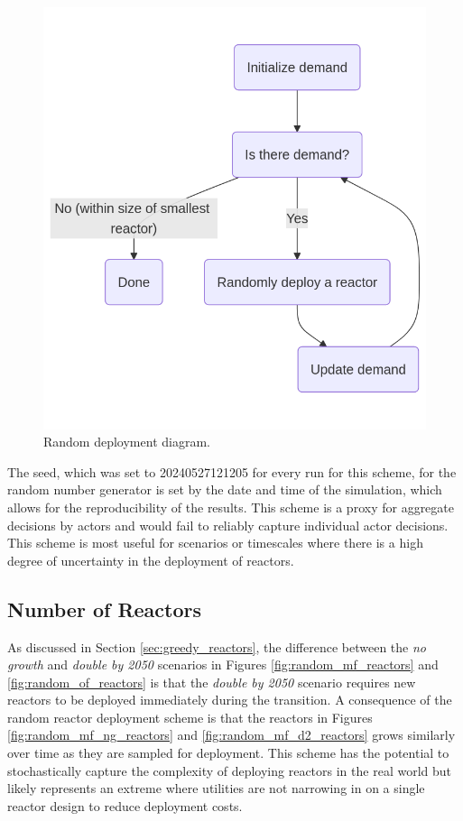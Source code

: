 \begin{figure}[H]
    \centering
    \includegraphics[scale=0.3]{images/schemes/random_diagram.png}
    \caption{Random deployment diagram.}
    \label{fig:random_diagram}
\end{figure}

The seed, which was set to 20240527121205 for every run for this scheme, for
the random number generator is set by the date and time of the simulation,
which allows for the reproducibility of the results. This scheme is a proxy for
aggregate decisions by actors and would fail to reliably capture individual
actor decisions. This scheme is most useful for scenarios or timescales where
there is a high degree of uncertainty in the deployment of reactors.


\subsection{Number of Reactors}
\label{sec:random_reactors}

As discussed in Section \ref{sec:greedy_reactors}, the difference between the \textit{no growth} and \textit{double by 2050} scenarios in Figures \ref{fig:random_mf_reactors} and \ref{fig:random_of_reactors} is that the \textit{double by 2050} scenario requires new reactors to be deployed immediately during the transition. A consequence of the random reactor deployment scheme is that the reactors in Figures \ref{fig:random_mf_ng_reactors} and \ref{fig:random_mf_d2_reactors} grows similarly over time as they are sampled for deployment. This scheme has the potential to stochastically capture the complexity of deploying reactors in the real world but likely represents an extreme where utilities are not narrowing in on a single reactor design to reduce deployment costs.


